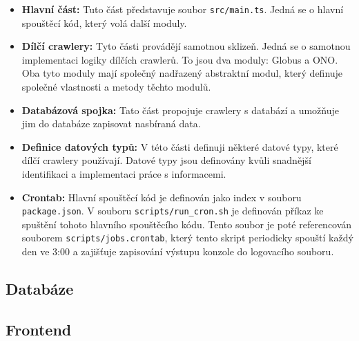 \begin{itemize}
    \item \textbf{Hlavní část:} Tuto část představuje soubor \texttt{src/main.ts}.
        Jedná se o hlavní spouštěcí kód, který volá další moduly.
    \item \textbf{Dílčí crawlery:} Tyto části provádějí samotnou sklizeň. Jedná se
        o samotnou implementaci logiky dílčích crawlerů. To jsou dva moduly: Globus
        a ONO. Oba tyto moduly mají společný nadřazený abstraktní modul, který
        definuje společné vlastnosti a metody těchto modulů.
    \item \textbf{Databázová spojka:} Tato část propojuje crawlery s databází
        a umožňuje jim do databáze zapisovat nasbíraná data.
    \item \textbf{Definice datových typů:} V této části definuji některé datové
        typy, které dílčí crawlery používají. Datové typy jsou definovány kvůli
        snadnější identifikaci a implementaci práce s informacemi.
    \item \textbf{Crontab:} Hlavní spouštěcí kód je definován jako index
        v souboru \texttt{package.json}. V souboru \texttt{scripts/run_cron.sh}
        je definován příkaz ke spuštění tohoto hlavního spouštěcího kódu. Tento
        soubor je poté referencován souborem \texttt{scripts/jobs.crontab},
        který tento skript periodicky spouští každý den ve 3:00 a zajišťuje
        zapisování výstupu konzole do logovacího souboru.
\end{itemize}

\subsection{Databáze}


\subsection{Frontend}


\endinput
